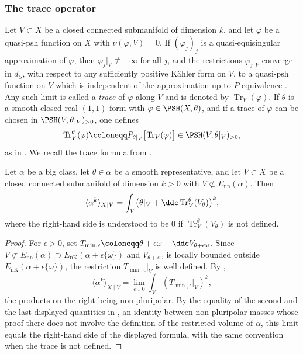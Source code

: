 \subsubsection*{The trace operator}
Let $V\subset X$ be a closed connected submanifold of dimension $k$, and let
$\varphi$ be a quasi-psh function on $X$ with $\nu(\varphi,V)=0$. If
$(\varphi_j)_j$ is a quasi-equisingular approximation of $\varphi$, then
$\varphi_j|_V\not\equiv-\infty$ for all $j$, and the restrictions
$\varphi_j|_V$ converge in ${d_S}$, with respect to any sufficiently
positive K\"ahler form on $V$, to a quasi-psh function on $V$ which is
independent of the approximation up to $P$-equivalence
\cite[Proposition~8.1.1, Definition~8.1.1, Proposition~8.1.2]{SGPT}. Any
such limit is called a \emph{trace} of $\varphi$ along $V$ and is denoted
by $\operatorname{Tr}_V(\varphi)$. If $\theta$ is a smooth closed real
$(1,1)$-form with $\varphi\in\PSH(X,\theta)$, and if a trace of
$\varphi$ can be chosen in $\PSH(V,\theta|_V)_{>0}$, one defines
\[
  \operatorname{Tr}^\theta_V(\varphi)\coloneqq P_{\theta|_V}\bigl[\operatorname{Tr}_V(\varphi)\bigr]
  \in\PSH(V,\theta|_V)_{>0},
\]
as in \cite[Definition~8.1.2]{SGPT}. We recall the trace formula from
\cite[Theorem~8.3.1]{SGPT}.

\begin{theorem}\label{nk:thm:trace-formula}
Let $\alpha$ be a big class, let $\theta\in\alpha$ be a smooth
representative, and let $V\subset X$ be a closed connected submanifold of
dimension $k>0$ with $V\not\subset{E_{\mathrm{nn}}}(\alpha)$. Then
\[
  \langle\alpha^k\rangle_{X\mid V}
  =\int_V\bigl(\theta|_V+\ddc\operatorname{Tr}^\theta_V(V_\theta)\bigr)^k,
\]
where the right-hand side is understood to be $0$ if
$\operatorname{Tr}^\theta_V(V_\theta)$ is not defined.
\end{theorem}

\begin{proof}
For $\epsilon>0$, set
$T_{\min,\epsilon}\coloneqq \theta+\epsilon\omega+\ddc V_{\theta+\epsilon\omega}$.
Since $V\not\subset{E_{\mathrm{nn}}}(\alpha)\supset{E_{\mathrm{nK}}}(\alpha+\epsilon\{\omega\})$
and $V_{\theta+\epsilon\omega}$ is locally bounded outside
${E_{\mathrm{nK}}}(\alpha+\epsilon\{\omega\})$, the restriction
$T_{\min,\epsilon}|_V$ is well defined. By
\cite[Remark~2.2 and equation~(2.3)]{CT22Restricted},
\[
  \langle\alpha^k\rangle_{X\mid V}
  =\lim_{\epsilon\downarrow0}\int_V(T_{\min,\epsilon}|_V)^k,
\]
the products on the right being non-pluripolar. By the equality of the
second and the last displayed quantities in
\cite[Theorem~8.3.1]{SGPT}, an identity between non-pluripolar
masses whose proof there does not involve the definition of the
restricted volume of $\alpha$, this limit equals
the right-hand side of the displayed formula, with the same convention
when the trace is not defined.
\end{proof}


